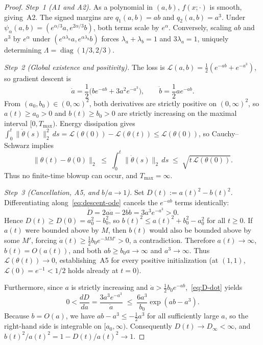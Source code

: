 \documentclass[11pt]{article}
\theoremstyle{plain}
\theoremstyle{definition}
\theoremstyle{remark}
\DeclareMathOperator{\diag}{diag}
\begin{document}
\begin{proof}
\emph{Step~1 (A1 and A2).} As a polynomial in $(a, b)$, $f(x; \cdot)$ is smooth, giving~A2. The signed margins are $q_1(a, b) = ab$ and $q_2(a, b) = a^3$. Under $\psi_\alpha(a, b) = (e^{\alpha/3}a, e^{2\alpha/3}b)$, both terms scale by $e^\alpha$. Conversely, scaling $ab$ and $a^3$ by $e^\alpha$ under $(e^{\alpha\lambda_a}a, e^{\alpha\lambda_b}b)$ forces $\lambda_a + \lambda_b = 1$ and $3\lambda_a = 1$, uniquely determining $\Lambda = \diag(1/3, 2/3)$.

\emph{Step~2 (Global existence and positivity).} The loss is $\mathcal{L}(a, b) = \frac{1}{2}(e^{-ab} + e^{-a^3})$, so gradient descent is
\begin{equation}\label{eq:descent-ode}
\dot{a} = \frac{1}{2}\bigl(b e^{-ab} + 3a^2 e^{-a^3}\bigr), \qquad
\dot{b} = \frac{1}{2} a e^{-ab}.
\end{equation}
From $(a_0, b_0) \in (0, \infty)^2$, both derivatives are strictly positive on $(0, \infty)^2$, so $a(t) \ge a_0 > 0$ and $b(t) \ge b_0 > 0$ are strictly increasing on the maximal interval $[0, T_{\max})$. Energy dissipation gives $\int_0^t \|\dot{\theta}(s)\|_2^2\,ds = \mathcal{L}(\theta(0)) - \mathcal{L}(\theta(t)) \le \mathcal{L}(\theta(0))$, so Cauchy--Schwarz implies
\[
\|\theta(t) - \theta(0)\|_2 \;\le\; \int_0^t \|\dot{\theta}(s)\|_2\,ds \;\le\; \sqrt{t\,\mathcal{L}(\theta(0))}.
\]
Thus no finite-time blowup can occur, and $T_{\max} = \infty$.

\emph{Step~3 (Cancellation, A5, and $b/a \to 1$).} Set $D(t) := a(t)^2 - b(t)^2$. Differentiating along~\eqref{eq:descent-ode} cancels the $e^{-ab}$ terms identically:
\begin{equation}\label{eq:D-dot}
\dot{D} = 2a\dot{a} - 2b\dot{b} = 3a^3 e^{-a^3} > 0.
\end{equation}
Hence $D(t) \ge D(0) = a_0^2 - b_0^2$, so $b(t)^2 \le a(t)^2 + b_0^2 - a_0^2$ for all $t \ge 0$. If $a(t)$ were bounded above by $M$, then $b(t)$ would also be bounded above by some $M'$, forcing $\dot{a}(t) \ge \frac{1}{2} b_0 e^{-MM'} > 0$, a contradiction. Therefore $a(t) \to \infty$, $b(t) = O(a(t))$, and both $ab \ge b_0 a \to \infty$ and $a^3 \to \infty$. Thus $\mathcal{L}(\theta(t)) \to 0$, establishing~A5 for every positive initialization (at $(1, 1)$, $\mathcal{L}(0) = e^{-1} < 1/2$ holds already at $t = 0$).

Furthermore, since $a$ is strictly increasing and $\dot{a} > \frac{1}{2}b_0 e^{-ab}$,~\eqref{eq:D-dot} yields
\[
0 < \frac{dD}{da} = \frac{3a^3 e^{-a^3}}{\dot{a}} \;\le\; \frac{6a^3}{b_0}\exp(ab - a^3).
\]
Because $b = O(a)$, we have $ab - a^3 \le -\frac{1}{2}a^3$ for all sufficiently large $a$, so the right-hand side is integrable on $[a_0, \infty)$. Consequently $D(t) \to D_\infty < \infty$, and $b(t)^2 / a(t)^2 = 1 - D(t)/a(t)^2 \to 1$.


\end{proof}
\end{document}

